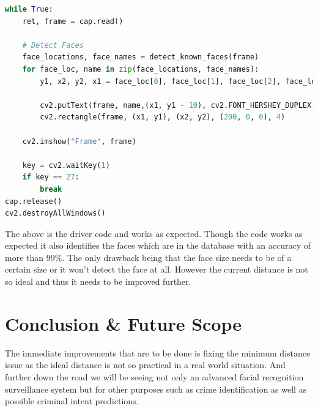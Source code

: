 \documentclass[a4paper]{article}
\begin{document}
\begin{lstlisting}[breaklines, language=Python]
while True:
    ret, frame = cap.read()

    # Detect Faces
    face_locations, face_names = detect_known_faces(frame)
    for face_loc, name in zip(face_locations, face_names):
        y1, x2, y2, x1 = face_loc[0], face_loc[1], face_loc[2], face_loc[3]

        cv2.putText(frame, name,(x1, y1 - 10), cv2.FONT_HERSHEY_DUPLEX, 1, (0, 0, 200), 2)
        cv2.rectangle(frame, (x1, y1), (x2, y2), (200, 0, 0), 4)

    cv2.imshow("Frame", frame)

    key = cv2.waitKey(1)
    if key == 27:
        break
cap.release()
cv2.destroyAllWindows()
\end{lstlisting}
 
\par The above is the driver code and works as expected.
Though the code works as expected it also identifies the faces which are in the database with an accuracy of more than 99\%. The only drawback being that the face size needs to be of a certain size or it won't detect the face at all. However the current distance is not so ideal and thus it needs to be improved further.
\clearpage
\section{Conclusion \& Future Scope}
The immediate improvements that are to be done is fixing the minimum distance issue as the ideal distance is not so practical in a real world situation. And further down the road we will be seeing not only an advanced facial recognition surveillance system but for other purposes such as crime identification as well as possible criminal intent predictions.
\clearpage


\end{document}
